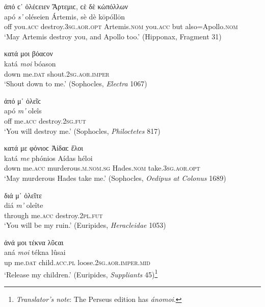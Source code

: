 \begin{exe}
\ex ἀπό ϲ᾽ ὀλέϲειεν Ἄρτεμιϲ, ϲὲ δὲ κὠπόλλων\\
\gll apó \emph{s'} oléseien Ártemis, sè dè kōpóllōn\\
off you.\textsc{acc} destroy.\textsc{3sg.aor.opt} Artemis.\textsc{nom}
you.\textsc{acc} but also=Apollo.\textsc{nom}\\
\trans `May Artemis destroy you, and Apollo too.' (Hipponax, Fragment 31)
\label{tmesis15}
\end{exe}

\begin{exe}
\ex κατά μοι βόαϲον\\
\gll katá \emph{moi} bóason\\
down me.\textsc{dat} shout.\textsc{2sg.aor.imper}\\
\trans `Shout down to me.' (Sophocles, \textit{Electra} 1067)
\label{tmesis16}
\end{exe}

\begin{exe}
\ex ἀπό μ᾽ ὀλεῖϲ\\
\gll apó \emph{m'} oleîs\\
off me.\textsc{acc} destroy.\textsc{2sg.fut}\\
\trans `You will destroy me.' (Sophocles, \textit{Philoctetes} 817)
\label{tmesis17}
\end{exe}

\begin{exe}
\ex κατά με φόνιοϲ Ἀίδαϲ ἕλοι\\
\gll katá \emph{me} phónios Aídas héloi\\
down me.\textsc{acc} murderous.\textsc{m.nom.sg} Hades.\textsc{nom}
take.\textsc{3sg.aor.opt}\\
\trans `May murderous Hades take me.' (Sophocles, \textit{Oedipus at Colonus} 1689)
\label{tmesis18}
\end{exe}

\begin{exe}
\ex διά μ᾽ ὀλεῖτε\\
\gll diá \emph{m'} oleîte\\
through me.\textsc{acc} destroy.\textsc{2pl.fut}\\
\trans `You will be my ruin.' (Euripides, \textit{Heracleidae} 1053)
\label{tmesis19}
\end{exe}

\begin{exe}
\ex ἀνά μοι τέκνα λῦϲαι\\
\gll aná \emph{moi} tékna lûsai\\
up me.\textsc{dat} child.\textsc{acc.pl} loose.\textsc{2sg.aor.imper.mid}\\
\trans `Release my children.' (Euripides, \textit{Suppliants} 45)\footnote{\emph{Translator's note}: The Perseus edition has \textit{ánomoi}.}
\label{tmesis20}
\end{exe}

